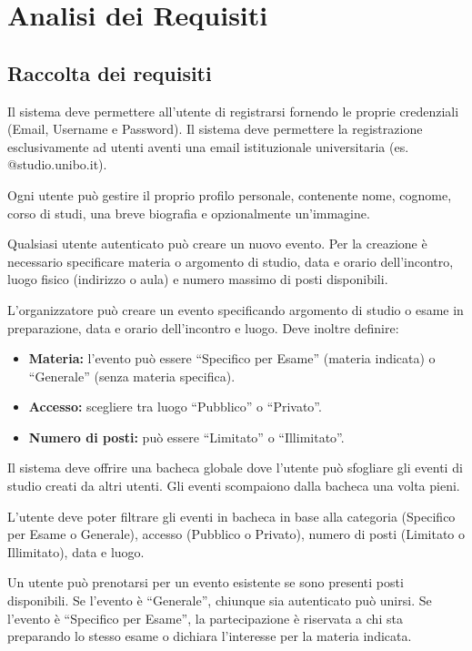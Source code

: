\documentclass[12pt,a4paper]{report}
\begin{document}
\newpage
{}
\chapter{Analisi dei Requisiti}

\section{Raccolta dei requisiti}
Il sistema deve permettere all'utente di registrarsi fornendo le proprie credenziali (Email, Username e Password). Il sistema deve permettere la registrazione esclusivamente ad utenti aventi una email istituzionale universitaria (es. @studio.unibo.it).

Ogni utente può gestire il proprio profilo personale, contenente nome, cognome, corso di studi, una breve biografia e opzionalmente un'immagine.

Qualsiasi utente autenticato può creare un nuovo evento. Per la creazione è necessario specificare materia o argomento di studio, data e orario dell'incontro, luogo fisico (indirizzo o aula) e numero massimo di posti disponibili.

L'organizzatore può creare un evento specificando argomento di studio o esame in preparazione, data e orario dell’incontro e luogo. Deve inoltre definire:
\begin{itemize}
    \item \textbf{Materia:} l'evento può essere ``Specifico per Esame'' (materia indicata) o ``Generale'' (senza materia specifica).
    \item \textbf{Accesso:} scegliere tra luogo ``Pubblico'' o ``Privato''.
    \item \textbf{Numero di posti:} può essere ``Limitato'' o ``Illimitato''.
\end{itemize}

Il sistema deve offrire una bacheca globale dove l'utente può sfogliare gli eventi di studio creati da altri utenti. Gli eventi scompaiono dalla bacheca una volta pieni.

L'utente deve poter filtrare gli eventi in bacheca in base alla categoria (Specifico per Esame o Generale), accesso (Pubblico o Privato), numero di posti (Limitato o Illimitato), data e luogo.

Un utente può prenotarsi per un evento esistente se sono presenti posti disponibili. Se l'evento è ``Generale'', chiunque sia autenticato può unirsi. Se l'evento è ``Specifico per Esame'', la partecipazione è riservata a chi sta preparando lo stesso esame o dichiara l'interesse per la materia indicata.
\end{document}
